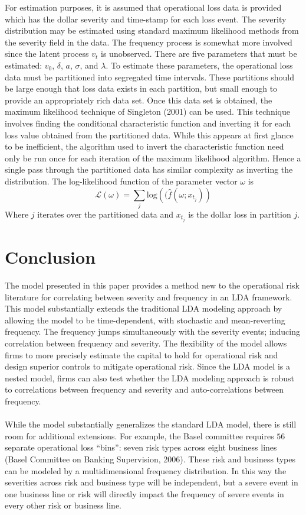 \documentclass{article}
\theoremstyle{definition}
\begin{document}
For estimation purposes, it is assumed that operational loss data is provided which has the dollar severity and time-stamp for each loss event.  The severity distribution may be estimated using standard maximum likelihood methods from the severity field in the data.  The frequency process is somewhat more involved since the latent process \(v_t\) is unobserved.  There are five parameters that must be estimated: \(v_0\), \(\delta\), \(a\), \(\sigma\), and \(\lambda\).  To estimate these parameters, the operational loss data must be partitioned into segregated time intervals.  These partitions should be large enough that loss data exists in each partition, but small enough to provide an appropriately rich data set.  Once this data set is obtained, the maximum likelihood technique of Singleton (2001) can be used.  This technique involves finding the conditional characteristic function and inverting it for each loss value obtained from the partitioned data.  While this appears at first glance to be inefficient, the algorithm used to invert the characteristic function need only be run once for each iteration of the maximum likelihood algorithm.  Hence a single pass through the partitioned data has similar complexity as inverting the distribution.  The log-likelihood function of the parameter vector \(\omega\) is 
\[\mathcal{L}(\omega)=\sum_{j} \mathrm{log}\left((\hat{f}\left(\omega; x_{t_j}\right)\right)\]
Where \(j\) iterates over the partitioned data and \(x_{t_j}\) is the dollar loss in partition \(j\).
\section{Conclusion}

The model presented in this paper provides a method new to the operational risk literature for correlating between severity and frequency in an LDA framework.  This model substantially extends the traditional LDA modeling approach by allowing the model to be time-dependent, with stochastic and mean-reverting frequency.  The frequency jumps simultaneously with the severity events; inducing correlation between frequency and severity. The flexibility of the model allows firms to more precisely estimate the capital to hold for operational risk and design superior controls to mitigate operational risk.  Since the LDA model is a nested model, firms can also test whether the LDA modeling approach is robust to correlations between frequency and severity and auto-correlations between frequency.
\\
\\
While the model substantially generalizes the standard LDA model, there is still room for additional extensions.  For example, the Basel committee requires \(56\) separate operational loss ``bins'': seven risk types across eight business lines (Basel Committee on Banking Supervision, 2006).  These risk and business types can be modeled by a multidimensional frequency distribution.  In this way the severities across risk and business type will be independent, but a severe event in one business line or risk will directly impact the frequency of severe events in every other risk or business line. 
\end{document}
